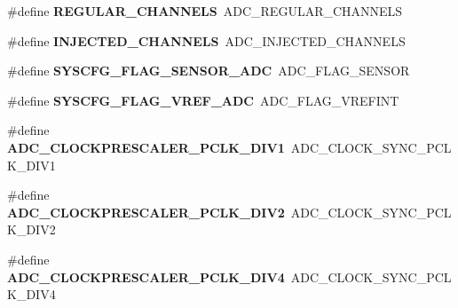 \begin{DoxyCompactItemize}
\item 
\hypertarget{group___h_a_l___a_d_c___aliased___defines_ga9480bc25f45fc189111dba13103c404e}{\#define {\bfseries R\-E\-G\-U\-L\-A\-R\-\_\-\-C\-H\-A\-N\-N\-E\-L\-S}~A\-D\-C\-\_\-\-R\-E\-G\-U\-L\-A\-R\-\_\-\-C\-H\-A\-N\-N\-E\-L\-S}\label{group___h_a_l___a_d_c___aliased___defines_ga9480bc25f45fc189111dba13103c404e}

\item 
\hypertarget{group___h_a_l___a_d_c___aliased___defines_ga458eefd477e1e06e313716de162b7d0f}{\#define {\bfseries I\-N\-J\-E\-C\-T\-E\-D\-\_\-\-C\-H\-A\-N\-N\-E\-L\-S}~A\-D\-C\-\_\-\-I\-N\-J\-E\-C\-T\-E\-D\-\_\-\-C\-H\-A\-N\-N\-E\-L\-S}\label{group___h_a_l___a_d_c___aliased___defines_ga458eefd477e1e06e313716de162b7d0f}

\item 
\hypertarget{group___h_a_l___a_d_c___aliased___defines_ga48929ac8156ee0ea52c25ad3ec9fed11}{\#define {\bfseries S\-Y\-S\-C\-F\-G\-\_\-\-F\-L\-A\-G\-\_\-\-S\-E\-N\-S\-O\-R\-\_\-\-A\-D\-C}~A\-D\-C\-\_\-\-F\-L\-A\-G\-\_\-\-S\-E\-N\-S\-O\-R}\label{group___h_a_l___a_d_c___aliased___defines_ga48929ac8156ee0ea52c25ad3ec9fed11}

\item 
\hypertarget{group___h_a_l___a_d_c___aliased___defines_gaa7f5151463037ce60032a869f3e71665}{\#define {\bfseries S\-Y\-S\-C\-F\-G\-\_\-\-F\-L\-A\-G\-\_\-\-V\-R\-E\-F\-\_\-\-A\-D\-C}~A\-D\-C\-\_\-\-F\-L\-A\-G\-\_\-\-V\-R\-E\-F\-I\-N\-T}\label{group___h_a_l___a_d_c___aliased___defines_gaa7f5151463037ce60032a869f3e71665}

\item 
\hypertarget{group___h_a_l___a_d_c___aliased___defines_gaaf80e00044e185957328f1d59bacdf37}{\#define {\bfseries A\-D\-C\-\_\-\-C\-L\-O\-C\-K\-P\-R\-E\-S\-C\-A\-L\-E\-R\-\_\-\-P\-C\-L\-K\-\_\-\-D\-I\-V1}~A\-D\-C\-\_\-\-C\-L\-O\-C\-K\-\_\-\-S\-Y\-N\-C\-\_\-\-P\-C\-L\-K\-\_\-\-D\-I\-V1}\label{group___h_a_l___a_d_c___aliased___defines_gaaf80e00044e185957328f1d59bacdf37}

\item 
\hypertarget{group___h_a_l___a_d_c___aliased___defines_ga058aa1143f9f7f123362039c9efcf4cb}{\#define {\bfseries A\-D\-C\-\_\-\-C\-L\-O\-C\-K\-P\-R\-E\-S\-C\-A\-L\-E\-R\-\_\-\-P\-C\-L\-K\-\_\-\-D\-I\-V2}~A\-D\-C\-\_\-\-C\-L\-O\-C\-K\-\_\-\-S\-Y\-N\-C\-\_\-\-P\-C\-L\-K\-\_\-\-D\-I\-V2}\label{group___h_a_l___a_d_c___aliased___defines_ga058aa1143f9f7f123362039c9efcf4cb}

\item 
\hypertarget{group___h_a_l___a_d_c___aliased___defines_ga98bc3d5a9f7e069183a205c8458a6645}{\#define {\bfseries A\-D\-C\-\_\-\-C\-L\-O\-C\-K\-P\-R\-E\-S\-C\-A\-L\-E\-R\-\_\-\-P\-C\-L\-K\-\_\-\-D\-I\-V4}~A\-D\-C\-\_\-\-C\-L\-O\-C\-K\-\_\-\-S\-Y\-N\-C\-\_\-\-P\-C\-L\-K\-\_\-\-D\-I\-V4}\label{group___h_a_l___a_d_c___aliased___defines_ga98bc3d5a9f7e069183a205c8458a6645}


\end{DoxyCompactItemize}
